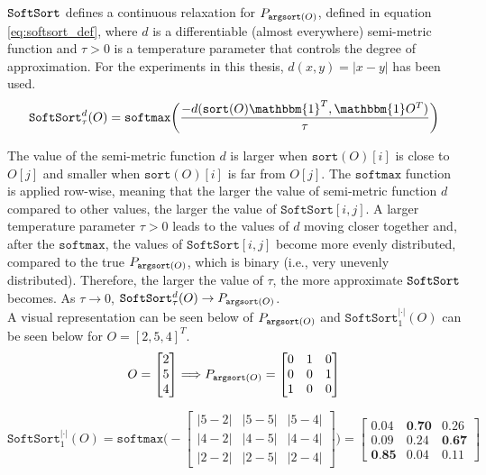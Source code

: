 $\operatorname*{\texttt{SoftSort}}$ defines a continuous relaxation for $P_{\operatorname*{\texttt{argsort}}(O)}$, defined in equation \ref{eq:softsort_def}, where $d$ is a differentiable (almost everywhere) semi-metric function and $\tau >0$ is a temperature parameter that controls the degree of approximation. For the experiments in this thesis, $d(x,y) = |x-y|$ has been used.\\

\begin{equation} \label{eq:softsort_def}
	\texttt{SoftSort}^d_{\tau}(O) = \texttt{softmax}\bigg( \frac{-d(\texttt{sort}(O)\mathbbm{1}^T, \mathbbm{1}O^T)}{\tau} \bigg)
\end{equation}

The value of the semi-metric function $d$ is larger when $\texttt{sort}(O)[i]$ is close to $O[j]$ and smaller when $\texttt{sort}(O)[i]$ is far from $O[j]$. The $\texttt{softmax}$ function is applied row-wise, meaning that the larger the value of semi-metric function $d$ compared to other values, the larger the value of $\texttt{SoftSort}[i,j]$. A larger temperature parameter $\tau>0$ leads to the values of $d$ moving closer together and, after the $\texttt{softmax}$, the values of $\texttt{SoftSort}[i,j]$ become more evenly distributed, compared to the true $P_{\operatorname*{\texttt{argsort}}(O)}$, which is binary (i.e., very unevenly distributed). Therefore, the larger the value of $\tau$, the more approximate $\operatorname*{\texttt{SoftSort}}$ becomes. As $\tau \to 0$, $\operatorname*{\texttt{SoftSort}}^d_{\tau}(O) \to P_{\operatorname*{\texttt{argsort}}(O)}$.\\

A visual representation can be seen below of $P_{\operatorname*{\texttt{argsort}}(O)}$ and $\texttt{SoftSort}^{|\cdot|}_{1}(O)$ can be seen below for $O = [2,5,4]^T$.\\

\begin{equation}
	O = \begin{bmatrix}
		2 \\
		5 \\
		4
	\end{bmatrix}
	\Longrightarrow
	P_{\operatorname*{\texttt{argsort}}(O)} =
	\begin{bmatrix}
		0 & 1 & 0 \\
		0 & 0 & 1 \\
		1 & 0 & 0 \\
	\end{bmatrix}
\end{equation}

\begin{equation} \label{eq:softsort_example}
	\texttt{SoftSort}^{|\cdot|}_{1}(O) = 
	\texttt{softmax} \Bigg(-\begin{bmatrix}
		|5-2| & |5-5| & |5-4| \\
		|4-2| & |4-5| & |4-4| \\
		|2-2| & |2-5| & |2-4|
	\end{bmatrix} \Bigg)	
	=
	\begin{bmatrix}
		0.04 & \textbf{0.70} & 0.26 \\
		0.09 & 0.24 & \textbf{0.67} \\
		\textbf{0.85} & 0.04 & 0.11
	\end{bmatrix}
\end{equation}

